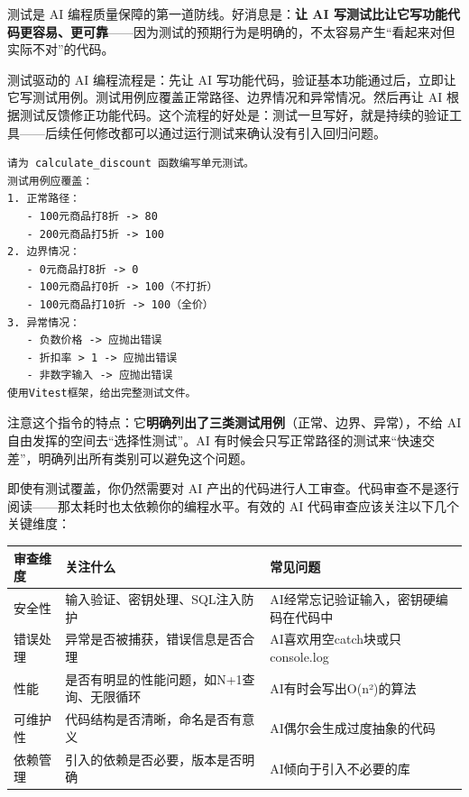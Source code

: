 


测试是 AI 编程质量保障的第一道防线。好消息是：\textbf{让 AI 写测试比让它写功能代码更容易、更可靠}——因为测试的预期行为是明确的，不太容易产生“看起来对但实际不对”的代码。

测试驱动的 AI 编程流程是：先让 AI 写功能代码，验证基本功能通过后，立即让它写测试用例。测试用例应覆盖正常路径、边界情况和异常情况。然后再让 AI 根据测试反馈修正功能代码。这个流程的好处是：测试一旦写好，就是持续的验证工具——后续任何修改都可以通过运行测试来确认没有引入回归问题。

\begin{lstlisting}
请为 calculate_discount 函数编写单元测试。
测试用例应覆盖：
1. 正常路径：
   - 100元商品打8折 -> 80
   - 200元商品打5折 -> 100
2. 边界情况：
   - 0元商品打8折 -> 0
   - 100元商品打0折 -> 100（不打折）
   - 100元商品打10折 -> 100（全价）
3. 异常情况：
   - 负数价格 -> 应抛出错误
   - 折扣率 > 1 -> 应抛出错误
   - 非数字输入 -> 应抛出错误
使用Vitest框架，给出完整测试文件。
\end{lstlisting}

注意这个指令的特点：它\textbf{明确列出了三类测试用例}（正常、边界、异常），不给 AI 自由发挥的空间去“选择性测试”。AI 有时候会只写正常路径的测试来“快速交差”，明确列出所有类别可以避免这个问题。


即使有测试覆盖，你仍然需要对 AI 产出的代码进行人工审查。代码审查不是逐行阅读——那太耗时也太依赖你的编程水平。有效的 AI 代码审查应该关注以下几个关键维度：

\begin{center}
\begin{tabularx}{\linewidth}{|X|X|X|}
\hline
\textbf{审查维度} & \textbf{关注什么} & \textbf{常见问题} \tabularnewline
\hline
安全性 & 输入验证、密钥处理、SQL注入防护 & AI经常忘记验证输入，密钥硬编码在代码中 \tabularnewline
错误处理 & 异常是否被捕获，错误信息是否合理 & AI喜欢用空catch块或只console.log \tabularnewline
性能 & 是否有明显的性能问题，如N+1查询、无限循环 & AI有时会写出O(n²)的算法 \tabularnewline
可维护性 & 代码结构是否清晰，命名是否有意义 & AI偶尔会生成过度抽象的代码 \tabularnewline
依赖管理 & 引入的依赖是否必要，版本是否明确 & AI倾向于引入不必要的库 \tabularnewline
\hline
\end{tabularx}
\end{center}

